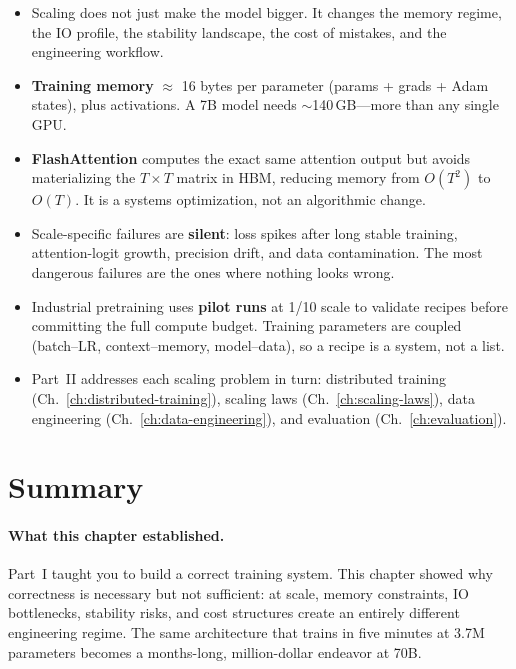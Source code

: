 \begin{takeaways}
\begin{itemize}[leftmargin=1.2em, itemsep=4pt]
  \item Scaling does not just make the model bigger. It changes the memory regime, the IO profile, the stability landscape, the cost of mistakes, and the engineering workflow.
  \item \textbf{Training memory} $\approx$ 16 bytes per parameter (params + grads + Adam states), plus activations. A 7B model needs $\sim$140\,GB---more than any single GPU.
  \item \textbf{FlashAttention} computes the exact same attention output but avoids materializing the $T \times T$ matrix in HBM, reducing memory from $O(T^2)$ to $O(T)$. It is a systems optimization, not an algorithmic change.
  \item Scale-specific failures are \textbf{silent}: loss spikes after long stable training, attention-logit growth, precision drift, and data contamination. The most dangerous failures are the ones where nothing looks wrong.
  \item Industrial pretraining uses \textbf{pilot runs} at 1/10 scale to validate recipes before committing the full compute budget. Training parameters are coupled (batch--LR, context--memory, model--data), so a recipe is a system, not a list.
  \item Part~II addresses each scaling problem in turn: distributed training (Ch.~\ref{ch:distributed-training}), scaling laws (Ch.~\ref{ch:scaling-laws}), data engineering (Ch.~\ref{ch:data-engineering}), and evaluation (Ch.~\ref{ch:evaluation}).
\end{itemize}
\end{takeaways}


\section{Summary}

\paragraph{What this chapter established.} Part~I taught you to build a correct training system. This chapter showed why correctness is necessary but not sufficient: at scale, memory constraints, IO bottlenecks, stability risks, and cost structures create an entirely different engineering regime. The same architecture that trains in five minutes at 3.7M parameters becomes a months-long, million-dollar endeavor at 70B.

